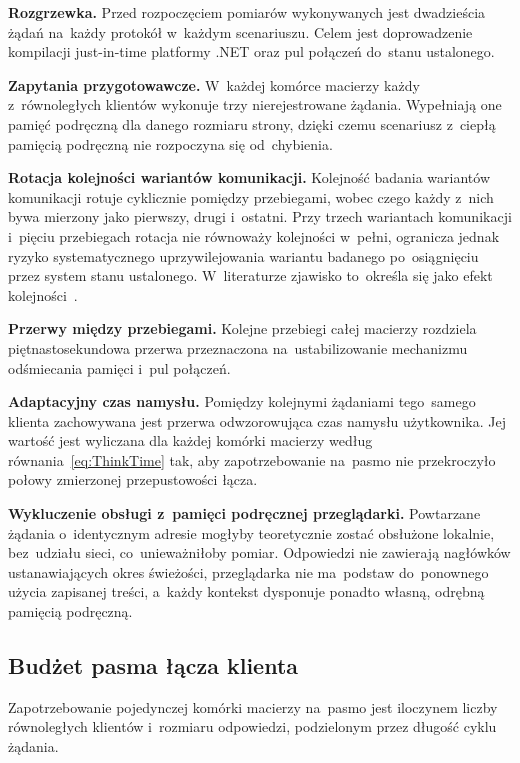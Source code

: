 \textbf{Rozgrzewka.} Przed rozpoczęciem pomiarów wykonywanych jest dwadzieścia żądań na~każdy protokół w~każdym scenariuszu. Celem jest doprowadzenie kompilacji just-in-time platformy .NET oraz pul połączeń do~stanu ustalonego.

\textbf{Zapytania przygotowawcze.} W~każdej komórce macierzy każdy z~równoległych klientów wykonuje trzy nierejestrowane żądania. Wypełniają one pamięć podręczną dla danego rozmiaru strony, dzięki czemu scenariusz z~ciepłą pamięcią podręczną nie rozpoczyna się od~chybienia.

\textbf{Rotacja kolejności wariantów komunikacji.} Kolejność badania wariantów komunikacji rotuje cyklicznie pomiędzy przebiegami, wobec czego każdy z~nich bywa mierzony jako pierwszy, drugi i~ostatni. Przy trzech wariantach komunikacji i~pięciu przebiegach rotacja nie równoważy kolejności w~pełni, ogranicza jednak ryzyko systematycznego uprzywilejowania wariantu badanego po~osiągnięciu przez system stanu ustalonego. W~literaturze zjawisko to~określa się jako efekt kolejności~\cite{bib:Jain1991}.

\textbf{Przerwy między przebiegami.} Kolejne przebiegi całej macierzy rozdziela piętnastosekundowa przerwa przeznaczona na~ustabilizowanie mechanizmu odśmiecania pamięci i~pul połączeń.

\begin{sloppypar}
\textbf{Adaptacyjny czas namysłu.} Pomiędzy kolejnymi żądaniami tego~samego klienta zachowywana jest przerwa odwzorowująca czas namysłu użytkownika. Jej wartość jest wyliczana dla każdej komórki macierzy według równania~\ref{eq:ThinkTime} tak, aby zapotrzebowanie na~pasmo nie przekroczyło połowy zmierzonej przepustowości łącza.
\end{sloppypar}

\textbf{Wykluczenie obsługi z~pamięci podręcznej przeglądarki.} Powtarzane żądania o~identycznym adresie mogłyby teoretycznie zostać obsłużone lokalnie, bez~udziału sieci, co~unieważniłoby pomiar. Odpowiedzi nie zawierają nagłówków ustanawiających okres świeżości, przeglądarka nie ma~podstaw do~ponownego użycia zapisanej treści, a~każdy kontekst dysponuje ponadto własną, odrębną pamięcią podręczną.

\subsection{Budżet pasma łącza klienta}
\label{subsec:BudzetPasma}

Zapotrzebowanie pojedynczej komórki macierzy na~pasmo jest iloczynem liczby równoległych klientów i~rozmiaru odpowiedzi, podzielonym przez długość cyklu żądania.

